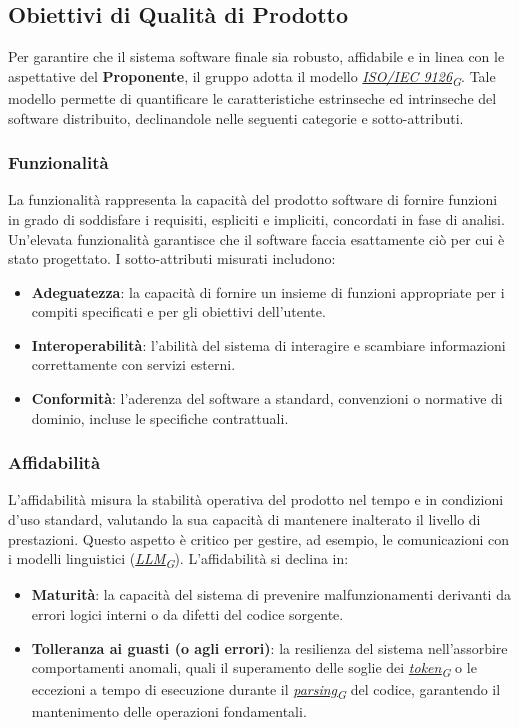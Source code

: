 \documentclass[12pt, a4paper]{article}
\newcommand{\urlglossario}{https://skynetunigroup.github.io/Code_Guardian/Documentazione/RTB/glossario_v1.0.0.pdf} %
\newcommand{\glo}[2]{\href{\urlglossario\#nameddest=#2}{#1\textsubscript{G}}}
\begin{document}
\subsection{Obiettivi di Qualità di Prodotto}
Per garantire che il sistema software finale sia robusto, affidabile e in linea con le aspettative del \textbf{Proponente}, il gruppo adotta il modello \textit{\glo{ISO/IEC 9126}{iso-iec-9126}}. Tale modello permette di quantificare le caratteristiche estrinseche ed intrinseche del software distribuito, declinandole nelle seguenti categorie e sotto-attributi.

\subsubsection{Funzionalità}
La funzionalità rappresenta la capacità del prodotto software di fornire funzioni in grado di soddisfare i requisiti, espliciti e impliciti, concordati in fase di analisi. Un'elevata funzionalità garantisce che il software faccia esattamente ciò per cui è stato progettato. I sotto-attributi misurati includono:
\begin{itemize}
    \item \textbf{Adeguatezza}: la capacità di fornire un insieme di funzioni appropriate per i compiti specificati e per gli obiettivi dell'utente.
    \item \textbf{Interoperabilità}: l'abilità del sistema di interagire e scambiare informazioni correttamente con servizi esterni.
    \item \textbf{Conformità}: l'aderenza del software a standard, convenzioni o normative di dominio, incluse le specifiche contrattuali.
\end{itemize}

\subsubsection{Affidabilità}
L'affidabilità misura la stabilità operativa del prodotto nel tempo e in condizioni d'uso standard, valutando la sua capacità di mantenere inalterato il livello di prestazioni. Questo aspetto è critico per gestire, ad esempio, le comunicazioni con i modelli linguistici (\textit{\glo{LLM}{llm}}). L'affidabilità si declina in:
\begin{itemize}
    \item \textbf{Maturità}: la capacità del sistema di prevenire malfunzionamenti derivanti da errori logici interni o da difetti del codice sorgente.
    \item \textbf{Tolleranza ai guasti (o agli errori)}: la resilienza del sistema nell'assorbire comportamenti anomali, quali il superamento delle soglie dei \textit{\glo{token}{token}} o le eccezioni a tempo di esecuzione durante il \textit{\glo{parsing}{parsing}} del codice, garantendo il mantenimento delle operazioni fondamentali.
\end{itemize}
\end{document}

